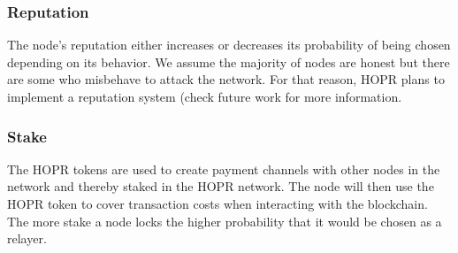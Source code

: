 \subsubsection{Reputation} 
The node’s reputation either increases or decreases its probability of being chosen depending on its behavior. We assume the majority of nodes are honest but there are some who misbehave to attack the network. For that reason, HOPR plans to implement a reputation system (check future work for more information.
\subsubsection{Stake}
The HOPR tokens are used to create payment channels with other nodes in the network and thereby staked in the HOPR network. The node will then use the HOPR token to cover transaction costs when interacting with the blockchain. The more stake a node locks the higher probability that it would be chosen as a relayer.











    

